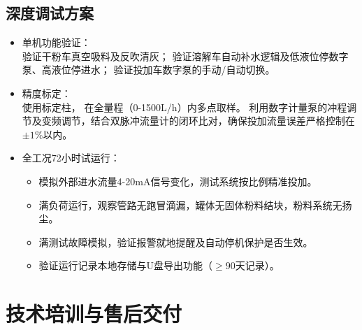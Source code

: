 \documentclass[UTF8,a4paper,12pt,titlepage]{ctexart}
\begin{document}
    \subsection{深度调试方案}
        \begin{itemize}
            \item 单机功能验证：\\
            验证干粉车真空吸料及反吹清灰；
            验证溶解车自动补水逻辑及低液位停数字泵、高液位停进水；
            验证投加车数字泵的手动/自动切换。
            \item 精度标定：\\
            使用标定柱，
            在全量程（0-1500L/h）内多点取样。
            利用数字计量泵的冲程调节及变频调节，结合双脉冲流量计的闭环比对，确保投加流量误差严格控制在$\pm 1\%$以内。
            \item 全工况72小时试运行：
            \begin{itemize}
                \item 模拟外部进水流量4-20mA信号变化，测试系统按比例精准投加。
                \item 满负荷运行，观察管路无跑冒滴漏，罐体无固体粉料结块，粉料系统无扬尘。
                \item 满测试故障模拟，验证报警就地提醒及自动停机保护是否生效。
                \item 验证运行记录本地存储与U盘导出功能（$\ge 90$天记录）。
            \end{itemize}
        \end{itemize}

\section{技术培训与售后交付}
\end{document}
